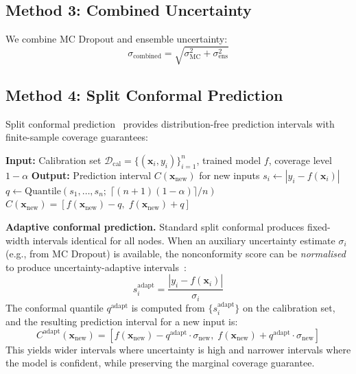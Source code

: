 \subsection{Method 3: Combined Uncertainty}

We combine MC Dropout and ensemble uncertainty:
\begin{equation}
    \sigma_{\text{combined}} = \sqrt{\sigma_{\text{MC}}^2 + \sigma_{\text{ens}}^2}
\end{equation}

\subsection{Method 4: Split Conformal Prediction}

Split conformal prediction~\cite{vovk2005algorithmic, angelopoulos2023conformal} provides distribution-free prediction intervals with finite-sample coverage guarantees:

\begin{algorithm}[htbp]
\caption[Split conformal prediction]{Split conformal prediction. A calibration set is used to compute a coverage-valid quantile; the evaluation set receives prediction intervals with guaranteed marginal coverage.}
\label{alg:conformal}
\begin{algorithmic}
\STATE \textbf{Input:} Calibration set $\mathcal{D}_\text{cal} = \{(\mathbf{x}_i, y_i)\}_{i=1}^n$, trained model $f$, coverage level $1 - \alpha$
\STATE \textbf{Output:} Prediction interval $C(\mathbf{x}_\text{new})$ for new inputs
    \STATE $s_i \leftarrow |y_i - f(\mathbf{x}_i)|$ 
\ENDFOR
\STATE $q \leftarrow \text{Quantile}\left(s_1, \ldots, s_n;\; \lceil(n+1)(1-\alpha)\rceil / n\right)$
\RETURN $C(\mathbf{x}_\text{new}) = \left[f(\mathbf{x}_\text{new}) - q,\; f(\mathbf{x}_\text{new}) + q\right]$
\end{algorithmic}
\end{algorithm}

\textbf{Adaptive conformal prediction.} Standard split conformal produces fixed-width intervals identical for all nodes. When an auxiliary uncertainty estimate $\sigma_i$ (e.g., from MC Dropout) is available, the nonconformity score can be \emph{normalised} to produce uncertainty-adaptive intervals~\cite{romano2019conformalized}:
\begin{equation}
    s_i^{\text{adapt}} = \frac{|y_i - f(\mathbf{x}_i)|}{\sigma_i}
\end{equation}
The conformal quantile $q^{\text{adapt}}$ is computed from $\{s_i^{\text{adapt}}\}$ on the calibration set, and the resulting prediction interval for a new input is:
\begin{equation}
    C^{\text{adapt}}(\mathbf{x}_\text{new}) = \left[f(\mathbf{x}_\text{new}) - q^{\text{adapt}} \cdot \sigma_\text{new},\; f(\mathbf{x}_\text{new}) + q^{\text{adapt}} \cdot \sigma_\text{new}\right]
\end{equation}
This yields wider intervals where uncertainty is high and narrower intervals where the model is confident, while preserving the marginal coverage guarantee.

